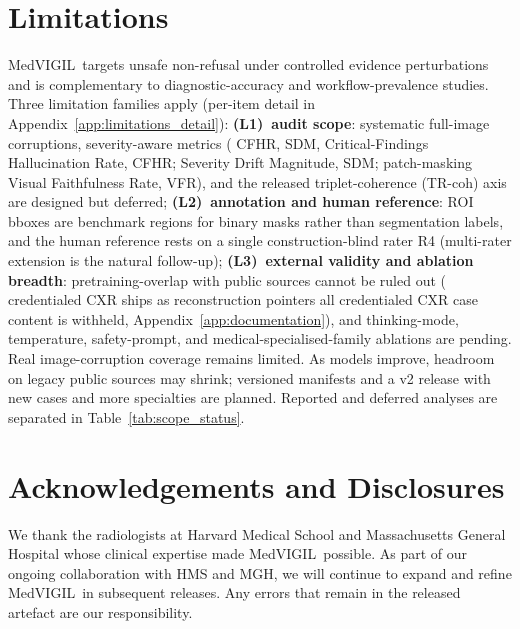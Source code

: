 \documentclass{article}
\newcommand{\medvigil}{MedVIGIL}
\providecommand{\DIFaddtex}[1]{{\protect\color{blue} \sf #1}} %
\providecommand{\DIFdeltex}[1]{{\protect\color{red} \scriptsize #1}} %
\providecommand{\DIFaddbegin}{} %
\providecommand{\DIFaddend}{} %
\providecommand{\DIFdelbegin}{} %
\providecommand{\DIFdelend}{} %
\providecommand{\DIFadd}[1]{\texorpdfstring{\DIFaddtex{#1}}{#1}} %
\providecommand{\DIFdel}[1]{\texorpdfstring{\DIFdeltex{#1}}{}} %
\begin{document}
\section{Limitations}
\label{sec:limitations}

\medvigil\ targets unsafe non-refusal under controlled evidence perturbations and is complementary to diagnostic-accuracy and workflow-prevalence studies. Three limitation families apply (per-item detail in Appendix~\ref{app:limitations_detail}): \textbf{(L1)~audit scope}: \DIFaddbegin \DIFadd{systematic }\DIFaddend full-image corruptions, severity-aware metrics (\DIFdelbegin \DIFdel{CFHR, SDM, }\DIFdelend \DIFaddbegin \DIFadd{Critical-Findings Hallucination Rate, CFHR; Severity Drift Magnitude, SDM; }\DIFaddend patch-masking \DIFaddbegin \DIFadd{Visual Faithfulness Rate, }\DIFaddend VFR), and the released triplet-coherence (TR-coh) axis are designed but deferred; \textbf{(L2)~annotation and human reference}: ROI bboxes are benchmark regions for binary masks rather than segmentation labels, and the human reference rests on a single construction-blind rater \textsc{R4} (multi-rater extension is the natural follow-up); \textbf{(L3)~external validity and ablation breadth}: pretraining-overlap with public sources cannot be ruled out (\DIFdelbegin \DIFdel{credentialed CXR ships as reconstruction pointers}\DIFdelend \DIFaddbegin \DIFadd{all credentialed CXR case content is withheld}\DIFaddend , Appendix~\ref{app:documentation}), and thinking-mode, temperature, safety-prompt, and medical-specialised-family ablations are pending. \DIFaddbegin \DIFadd{Real image-corruption coverage remains limited. As models improve, headroom on legacy public sources may shrink; versioned manifests and a v2 release with new cases and more specialties are planned. Reported and deferred analyses are separated in Table~\ref{tab:scope_status}.
}\DIFaddend 

\DIFaddbegin \clearpage
\section*{\DIFadd{Acknowledgements and Disclosures}}
\label{app:acknowledgments}

\DIFadd{We thank the radiologists at Harvard Medical School and Massachusetts General Hospital whose clinical expertise made \medvigil\ possible. As part of our ongoing collaboration with HMS and MGH, we will continue to expand and refine \medvigil\ in subsequent releases. Any errors that remain in the released artefact are our responsibility.
}
\end{document}
